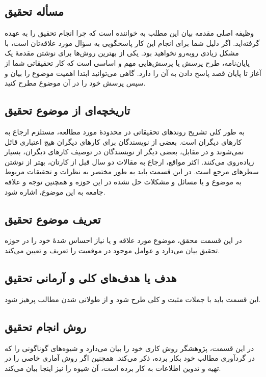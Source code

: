 \subsection{مسأله تحقیق}
وظیفه اصلی مقدمه بیان این مطلب به خواننده است که چرا انجام تحقیق را به عهده گرفته‌اید. اگر دلیل شما برای انجام این کار پاسخگویی به سؤال مورد علاقه‌تان است، با مشکل زیادی روبه‌رو نخواهید بود. یکی از بهترین روش‌ها برای نوشتن مقدمهٔ یک پایان‌نامه، طرح پرسش یا پرسش‌هایی مهم و اساسی است که کار تحقیقاتی شما از آغاز تا پایان قصد پاسخ دادن به آن را دارد. گاهی می‌توانید ابتدا اهمیت موضوع را بیان و سپس پرسش خود را در آن موضوع مطرح کنید.

\subsection{تاریخچه‌ای از موضوع تحقیق}
به طور کلی تشریح روندهای تحقیقاتی در محدودهٔ مورد مطالعه، مستلزم ارجاع به کارهای دیگران است. بعضی از نویسندگان برای کارهای دیگران هیچ اعتباری قائل نمی‌شوند و در مقابل، بعضی دیگر از نویسندگان در توصیف کارهای دیگران، بسیار زیاده‌روی می‌کنند. اکثر مواقع، ارجاع به مقالات دو سال قبل از کارتان، بهتر از نوشتن سطرهای مرجع است. در این قسمت باید به طور مختصر به نظرات و تحقیقات مربوط به موضوع و یا مسائل و مشکلات حل نشده در این حوزه و همچنین توجه و علاقه جامعه به این موضوع، اشاره شود.

\subsection{تعریف موضوع تحقیق}
در این قسمت محقق، موضوع مورد علاقه و یا نیاز احساس شدهٔ خود را در حوزه تحقیق بیان می‌دارد و عوامل موجود در موقعیت را تعریف و تعیین می‌کند.

\subsection{هدف یا هدف‌های کلی و آرمانی تحقیق}
این قسمت باید با جملات مثبت و کلی طرح شود و از طولانی شدن مطالب پرهیز شود.

\subsection{روش انجام تحقیق}
در این قسمت، پژوهشگر روش کاری خود را بیان می‌دارد و شیوه‌های گوناگونی را که در گردآوری مطالب خود بکار برده، ذکر می‌کند. همچنین اگر روش آماری خاصی را در تهیه و تدوین اطلاعات به کار برده است، آن شیوه را نیز اینجا بیان می‌کند.

